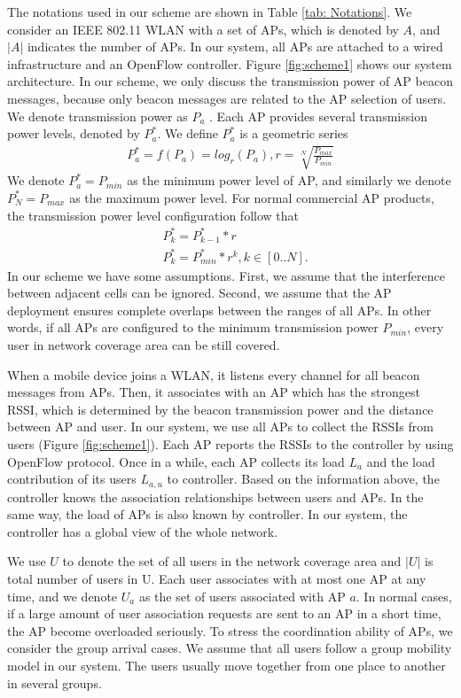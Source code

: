 The notations used in our scheme are shown in Table \ref{tab: Notations}. We consider an IEEE 802.11 WLAN with a set of APs, which is denoted by $A$, and $|A|$ indicates the number of APs. In our system, all APs are attached to a wired infrastructure and an OpenFlow controller. Figure \ref{fig:scheme1} shows our system architecture. In our scheme, we only discuss the transmission power of AP beacon messages, because only beacon messages are related to the AP selection of users. We denote transmission power as $P_a$  . Each AP provides several transmission power levels, denoted by $P_a^*$. We define $P_a^*$ is a geometric series
\begin{eqnarray}
{P_a^*}=f({P_a})=log _r⁡\left({P_a} \right)  ,  r=\sqrt[N]{\frac{P_{max}}{P_{min}}}
\end{eqnarray}
We denote $P_a^*=P_{min}$ as the minimum power level of AP, and similarly we denote $P_N^*=P_{max}$ as the maximum power level. For normal commercial AP products, the transmission power level configuration follow that
\begin{align}
&P_k^*={P_{k-1}^*}*r\\										
&P_k^*={P_{min}^*}*{r^k}, k\in[0..N].							
\end{align}
In our scheme we have some assumptions. First, we assume that the interference between adjacent cells can be ignored. Second, we assume that the AP deployment ensures complete overlaps between the ranges of all APs. In other words, if all APs are configured to the minimum transmission power $P_{min}$, every user in network coverage area can be still covered.

When a mobile device joins a WLAN, it listens every channel for all beacon messages from APs. Then, it associates with an AP which has the strongest RSSI, which is determined by the beacon transmission power and the distance between AP and user. In our system, we use all APs to collect the RSSIs from users  (Figure \ref{fig:scheme1}). Each AP reports the RSSIs to the controller by using OpenFlow protocol. Once in a while, each AP collects its load $L_a$  and the load contribution of its users $L_{a,u}$  to controller. Based on the information above, the controller knows the association relationships between users and APs. In the same way, the load of APs is also known by controller. In our system, the controller has a global view of the whole network.

We use $U$ to denote the set of all users in the network coverage area and $|U|$ is total number of users in U. Each user associates with at most one AP at any time, and we denote $U_a$ as the set of users associated with AP $a$. In normal cases, if a large amount of user association requests are sent to an AP in a short time, the AP become overloaded seriously. To stress the coordination ability of APs, we consider the group arrival cases. We assume that all users follow a group mobility model in our system. The users usually move together from one place to another in several groups.

